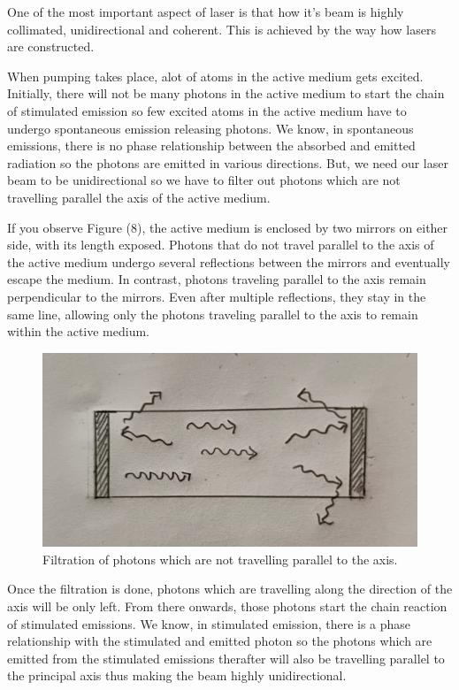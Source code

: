 \documentclass[12pt]{article}
\begin{document}
One of the most important aspect of laser is that how it's beam is highly collimated, unidirectional and coherent. This is achieved by the way how lasers are constructed. \vspace{.2cm}

When pumping takes place, alot of atoms in the active medium gets excited. Initially, there will not be many photons in the active medium to start the chain of stimulated emission so few excited atoms in the active medium have to undergo spontaneous emission releasing photons. We know, in spontaneous emissions, there is no phase relationship between the absorbed and emitted radiation so the photons are emitted in various directions. But, we need our laser beam to be unidirectional so we have to filter out photons which are not travelling parallel the axis of the active medium. \vspace{.2cm}

If you observe Figure (8), the active medium is enclosed by two mirrors on either side, with its length exposed. Photons that do not travel parallel to the axis of the active medium undergo several reflections between the mirrors and eventually escape the medium. In contrast, photons traveling parallel to the axis remain perpendicular to the mirrors. Even after multiple reflections, they stay in the same line, allowing only the photons traveling parallel to the axis to remain within the active medium.

\begin{figure}[H]
    \centering
    \includegraphics[scale=.6]{./img/12_filtration.png}
    \caption{Filtration of photons which are not travelling parallel to the axis.}
\end{figure}

Once the filtration is done, photons which are travelling along the direction of the axis will be only left. From there onwards, those photons start the chain reaction of stimulated emissions. We know, in stimulated emission, there is a phase relationship with the stimulated and emitted photon so the photons which are emitted from the stimulated emissions therafter will also be travelling parallel to the principal axis thus making the beam highly unidirectional. \vspace{.2cm}
\end{document}

